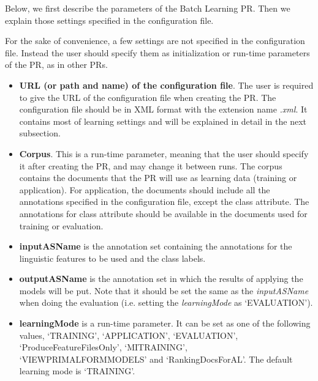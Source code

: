 Below, we first describe the parameters of the Batch Learning PR. Then we explain
those settings specified in the configuration file.



For the sake of convenience, a few settings are not specified in the
configuration file. Instead the user should specify them as initialization or
run-time parameters of the PR, as in other PRs.

\begin{itemize}

\item {\bf URL (or path and name) of the configuration file}. The user is
required to give the URL of the configuration file when creating the PR. The
configuration file should be in XML format with the extension name {\em .xml}. It
contains most of learning settings and will be explained in detail in the next
subsection.

\item {\bf Corpus}. This is a run-time parameter, meaning that the user should
  specify it after creating the PR, and may change it between runs. The corpus
  contains the documents that the PR will use as learning data (training or
  application). For application, the documents should include all the
  annotations specified in the configuration file, except the class
  attribute. The annotations for class attribute should be available in the
  documents used for training or evaluation.

\item {\bf inputASName} is the annotation set containing the annotations for 
the linguistic features to be used and the class labels.

\item {\bf outputASName} is the annotation set in which the results
 of applying the models will be put. Note that it should be set the
same as the {\em inputASName} when doing the evaluation (i.e. setting the {\em
learningMode} as `EVALUATION').

\item {\bf learningMode} is a run-time parameter. It can be set as one of the
following values, `TRAINING', `APPLICATION', `EVALUATION',
`ProduceFeatureFilesOnly', `MITRAINING', `VIEWPRIMALFORMMODELS' and
`RankingDocsForAL'. The default learning mode is `TRAINING'.


\end{itemize}
